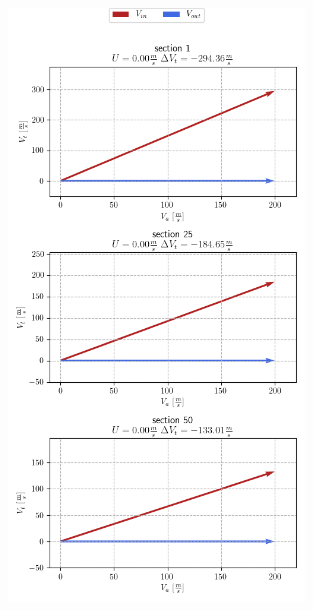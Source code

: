 {\begin{frame}
\begin{columns}
\begin{figure}
				\includegraphics[width=0.7\textwidth]{figures/statorVelocityTriangle.png}
			\end{figure}
	\end{columns}
\end{frame}
}

